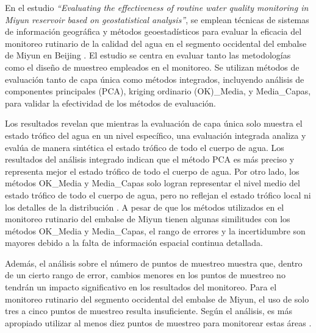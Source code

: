 En el estudio \textit{``Evaluating the effectiveness of routine water quality monitoring in Miyun reservoir based on geostatistical analysis''}, se emplean técnicas de sistemas de información geográfica y métodos geoestadísticos para evaluar la eficacia del monitoreo rutinario de la calidad del agua en el segmento occidental del embalse de Miyun en Beijing \cite{Zhengjun2010}. El estudio se centra en evaluar tanto las metodologías como el diseño de muestreo empleados en el monitoreo. Se utilizan métodos de evaluación tanto de capa única como métodos integrados, incluyendo análisis de componentes principales (PCA), kriging ordinario (OK)\_Media, y Media\_Capas, para validar la efectividad de los métodos de evaluación.

Los resultados revelan que mientras la evaluación de capa única solo muestra el estado trófico del agua en un nivel específico, una evaluación integrada analiza y evalúa de manera sintética el estado trófico de todo el cuerpo de agua. Los resultados del análisis integrado indican que el método PCA es más preciso y representa mejor el estado trófico de todo el cuerpo de agua. Por otro lado, los métodos OK\_Media y Media\_Capas solo logran representar el nivel medio del estado trófico de todo el cuerpo de agua, pero no reflejan el estado trófico local ni los detalles de la distribución \cite{Zhengjun2010}. A pesar de que los métodos utilizados en el monitoreo rutinario del embalse de Miyun tienen algunas similitudes con los métodos OK\_Media y Media\_Capas, el rango de errores y la incertidumbre son mayores debido a la falta de información espacial continua detallada.

Además, el análisis sobre el número de puntos de muestreo muestra que, dentro de un cierto rango de error, cambios menores en los puntos de muestreo no tendrán un impacto significativo en los resultados del monitoreo. Para el monitoreo rutinario del segmento occidental del embalse de Miyun, el uso de solo tres a cinco puntos de muestreo resulta insuficiente. Según el análisis, es más apropiado utilizar al menos diez puntos de muestreo para monitorear estas áreas \cite{Zhengjun2010}.



